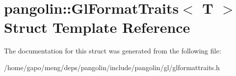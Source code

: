 \hypertarget{structpangolin_1_1_gl_format_traits}{}\section{pangolin\+:\+:Gl\+Format\+Traits$<$ T $>$ Struct Template Reference}
\label{structpangolin_1_1_gl_format_traits}


The documentation for this struct was generated from the following file\+:\begin{DoxyCompactItemize}
\item 
/home/gapo/meng/deps/pangolin/include/pangolin/gl/glformattraits.\+h\end{DoxyCompactItemize}
